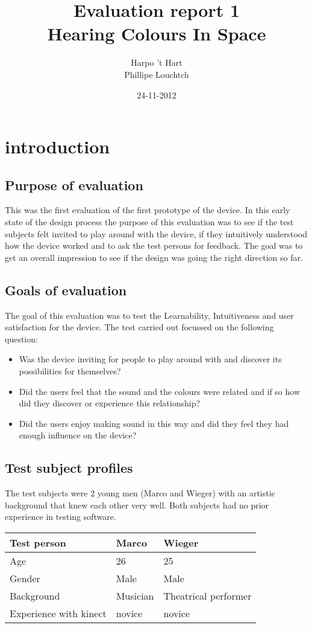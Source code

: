 \documentclass[11pt]{article}
\begin{document}
\title{Evaluation report 1\\ Hearing Colours In Space}
\author{Harpo 't Hart \\ Phillipe Louchtch}
\date{24-11-2012}
\maketitle

\tableofcontents

\section{introduction}
\subsection{Purpose of evaluation}
This was the first evaluation of the first prototype of the device. In this early state of the design process the purpose of this evaluation was to see if the test subjects felt invited to play around with the device, if they intuitively understood how the device worked and to ask the test persons for feedback. The goal was to get an overall impression to see if the design was going the right direction so far.
\subsection{Goals of evaluation}
The goal of this evaluation was to test the Learnability, Intuitiveness and user satisfaction for the device. The test carried out focussed on the following question:
\begin{itemize}
	\item Was the device inviting for people to play around with and discover its possibilities for themselves?
	\item Did the users feel that the sound and the colours were related and if so how did they discover or experience this relationship?
	\item Did the users enjoy making sound in this way and did they feel they had enough influence on the device?
\end{itemize}
\subsection{Test subject profiles}
The test subjects were 2 young men (Marco and Wieger) with an artistic background that knew each other very well. Both subjects had no prior experience in testing software.
\begin{center}
    \begin{tabular}{| l | l | l |}
    \hline
     	Test person & Marco & Wieger \\ \hline
	Age & 26 & 25 \\ \hline
	Gender & Male & Male \\ \hline
	Background & Musician & Theatrical performer \\ \hline
	Experience with kinect & novice & novice \\ \hline
    \end{tabular}
\end{center}
\end{document}
